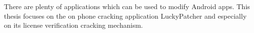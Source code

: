 There are plenty of applications which can be used to modify Android apps. This thesis focuses on the on phone cracking application LuckyPatcher and especially on its license verification cracking mechanism.
